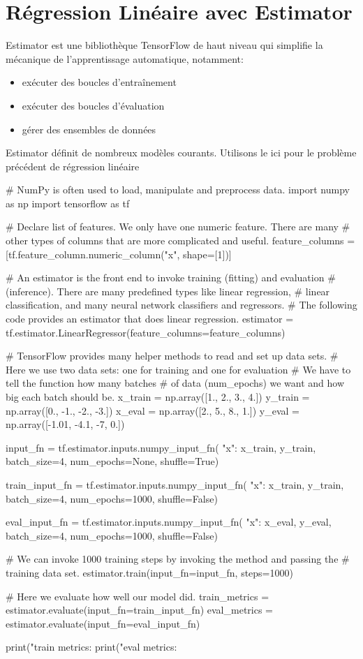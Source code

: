 \documentclass[a4paper,11pt]{book}
\begin{document}
\section{Régression Linéaire avec Estimator}

Estimator est une bibliothèque TensorFlow de haut niveau qui simplifie la mécanique de l'apprentissage automatique, notamment:
\begin{itemize}
\item exécuter des boucles d'entraînement
\item exécuter des boucles d'évaluation
\item gérer des ensembles de données
\end{itemize}

Estimator définit de nombreux modèles courants.
Utilisons le ici pour le problème précédent de régression linéaire
\begin{mypython}
# NumPy is often used to load, manipulate and preprocess data.
import numpy as np
import tensorflow as tf

# Declare list of features. We only have one numeric feature. There are many
# other types of columns that are more complicated and useful.
feature_columns = [tf.feature_column.numeric_column("x", shape=[1])]

# An estimator is the front end to invoke training (fitting) and evaluation
# (inference). There are many predefined types like linear regression,
# linear classification, and many neural network classifiers and regressors.
# The following code provides an estimator that does linear regression.
estimator = tf.estimator.LinearRegressor(feature_columns=feature_columns)

# TensorFlow provides many helper methods to read and set up data sets.
# Here we use two data sets: one for training and one for evaluation
# We have to tell the function how many batches
# of data (num_epochs) we want and how big each batch should be.
x_train = np.array([1., 2., 3., 4.])
y_train = np.array([0., -1., -2., -3.])
x_eval = np.array([2., 5., 8., 1.])
y_eval = np.array([-1.01, -4.1, -7, 0.])

input_fn = tf.estimator.inputs.numpy_input_fn(
    {"x": x_train}, y_train, batch_size=4, num_epochs=None, shuffle=True)

train_input_fn = tf.estimator.inputs.numpy_input_fn(
    {"x": x_train}, y_train, batch_size=4, num_epochs=1000, shuffle=False)

eval_input_fn = tf.estimator.inputs.numpy_input_fn(
    {"x": x_eval}, y_eval, batch_size=4, num_epochs=1000, shuffle=False)

# We can invoke 1000 training steps by invoking the  method and passing the
# training data set.
estimator.train(input_fn=input_fn, steps=1000)

# Here we evaluate how well our model did.
train_metrics = estimator.evaluate(input_fn=train_input_fn)
eval_metrics = estimator.evaluate(input_fn=eval_input_fn)

print("train metrics: %
print("eval metrics: %
\end{mypython}
\end{document}
